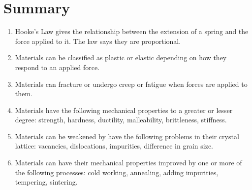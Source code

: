\section{Summary}
\begin{enumerate}
\item Hooke's Law gives the relationship between the extension of a spring and the force applied to it. The law says they are proportional.
\item Materials can be classified as plastic or elastic depending on how they respond to an applied force. 
\item Materials can fracture or undergo creep or fatigue when forces are applied to them.
\item Materials have the following mechanical properties to a greater or lesser degree: strength, hardness, ductility, malleability, brittleness, stiffness.
\item Materials can be weakened by have the following problems in their crystal lattice: vacancies, dislocations, impurities, difference in grain size.
\item Materials can have their mechanical properties improved by one or more of the following processes: cold working, annealing, adding impurities, tempering, sintering.

\end{enumerate}

